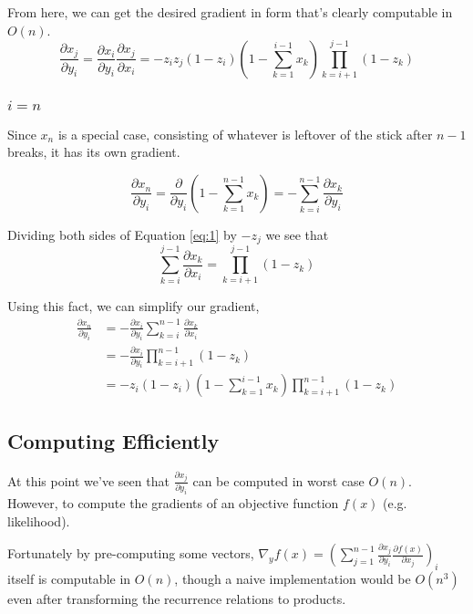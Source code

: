 \documentclass{article}
\begin{document}
From here, we can get the desired gradient in form that's clearly computable in
$O(n)$.
\begin{equation} \label{eq:1}
\frac{\partial x_j}{\partial y_i}
= \frac{\partial x_i}{\partial y_i} \frac{\partial x_j}{\partial x_i}
= - z_i z_j (1 - z_i) \left(1 - \sum_{k=1}^{i-1} x_k \right) \prod_{k=i+1}^{j-1} (1 - z_k)
\end{equation}





\subsubsection{$i = n$}

Since $x_n$ is a special case, consisting of whatever is leftover of the stick
after $n-1$ breaks, it has its own gradient.

$$\frac{\partial x_n}{\partial y_i}
= \frac{\partial}{\partial y_i} \left( 1 - \sum_{k=1}^{n-1} x_k \right)
= - \sum_{k=i}^{n-1} \frac{\partial x_k}{\partial y_i}
$$

Dividing both sides of Equation \ref{eq:1} by $-z_j$ we see that
$$\sum_{k=i}^{j-1} \frac{\partial x_k}{\partial x_i} = \prod_{k=i+1}^{j-1} (1 - z_k)$$

Using this fact, we can simplify our gradient,
\begin{align}
\frac{\partial x_n}{\partial y_i}
&= - \frac{\partial x_i}{\partial y_i} \sum_{k=i}^{n-1} \frac{\partial
x_k}{\partial x_i} \\
&= - \frac{\partial x_i}{\partial y_i} \prod_{k=i+1}^{n-1} (1 - z_k) \\
&= - z_i (1 - z_i) \left( 1 - \sum_{k=1}^{i-1} x_k \right) \prod_{k=i+1}^{n-1} (1 - z_k)
\end{align}


\subsection{Computing Efficiently}

At this point we've seen that $\frac{\partial x_j}{\partial y_i}$ can be
computed in worst case $O(n)$. However, to compute the gradients of an objective
function $f(x)$ (e.g. likelihood).

Fortunately by pre-computing some vectors, $\nabla_y f(x) = \left( \sum_{j=1}^{n-1}
\frac{\partial x_j}{\partial y_i} \frac{\partial f(x)}{\partial x_j} \right)_i$
itself is computable in $O(n)$, though a naive implementation would be $O(n^3)$
even after transforming the recurrence relations to products.
\end{document}

